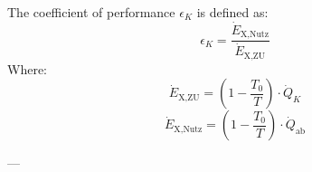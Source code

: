 The coefficient of performance \( \epsilon_K \) is defined as:  
\[
\epsilon_K = \frac{\dot{E}_{\text{X,Nutz}}}{\dot{E}_{\text{X,ZU}}}
\]  
Where:  
\[
\dot{E}_{\text{X,ZU}} = \left( 1 - \frac{T_0}{T} \right) \cdot \dot{Q}_K
\]  
\[
\dot{E}_{\text{X,Nutz}} = \left( 1 - \frac{T_0}{T} \right) \cdot \dot{Q}_{\text{ab}}
\]  

---